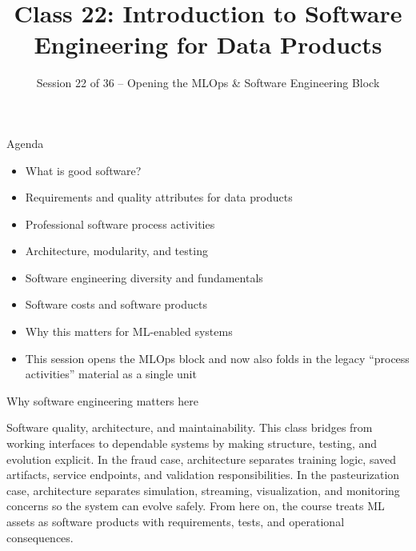 

\title{Class 22: Introduction to Software Engineering for Data Products}
\subtitle{Session 22 of 36 -- Opening the MLOps \& Software Engineering Block}
\author{\coursename}
\date{}



\frame{\titlepage \coursefooter}

\begin{frame}{Agenda}
\begin{itemize}
\item What is good software?
\item Requirements and quality attributes for data products
\item Professional software process activities
\item Architecture, modularity, and testing
\item Software engineering diversity and fundamentals
\item Software costs and software products
\item Why this matters for ML-enabled systems
\item This session opens the MLOps block and now also folds in the legacy ``process activities'' material as a single unit
\end{itemize}
\coursefooter
\end{frame}

\begin{frame}{Why software engineering matters here}
\coursefooter
\end{frame}

\coursecontextframe
{Software quality, architecture, and maintainability.}
{This class bridges from working interfaces to dependable systems by making structure, testing, and evolution explicit.}
{In the fraud case, architecture separates training logic, saved artifacts, service endpoints, and validation responsibilities.}
{In the pasteurization case, architecture separates simulation, streaming, visualization, and monitoring concerns so the system can evolve safely.}
{From here on, the course treats ML assets as software products with requirements, tests, and operational consequences.}

